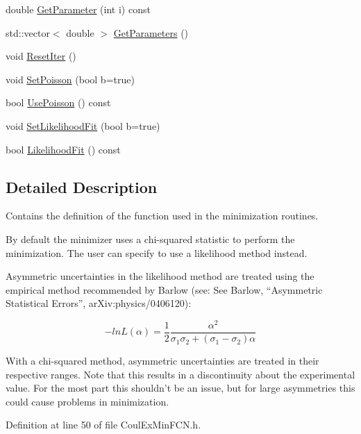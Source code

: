 \begin{DoxyCompactItemize}
double \hyperlink{classCoulExMinFCN_aa588591bbc923ab42070b42b74c1dfc8}{Get\-Parameter} (int i) const 
\item 
std\-::vector$<$ double $>$ \hyperlink{classCoulExMinFCN_ac49f8e36a62aac46b1300eca173f486f}{Get\-Parameters} ()
\item 
void \hyperlink{classCoulExMinFCN_ad15983e7cecf6fb939c55d47b2a9e700}{Reset\-Iter} ()
\item 
void \hyperlink{classCoulExMinFCN_a96c96926312d6e52c797274035410894}{Set\-Poisson} (bool b=true)
\item 
bool \hyperlink{classCoulExMinFCN_a076212903b18324a472ef11310bf8fc3}{Use\-Poisson} () const 
\item 
void \hyperlink{classCoulExMinFCN_a17f18c83c3a60c89e038f91b946c495d}{Set\-Likelihood\-Fit} (bool b=true)
\item 
bool \hyperlink{classCoulExMinFCN_a126ede898be9dd935ea7f65b7120f223}{Likelihood\-Fit} () const 
\end{DoxyCompactItemize}


\subsection{Detailed Description}
Contains the definition of the function used in the minimization routines. 

By default the minimizer uses a chi-\/squared statistic to perform the minimization. The user can specify to use a likelihood method instead.

Asymmetric uncertainties in the likelihood method are treated using the empirical method recommended by Barlow (see\-: See Barlow, “\-Asymmetric Statistical Errors”, ar\-Xiv\-:physics/0406120)\-:

\[ -lnL(\alpha) = \frac{1}{2} \frac{\alpha^2}{\sigma_1\sigma_2 + (\sigma_1 - \sigma_2)\alpha} \]

With a chi-\/squared method, asymmetric uncertainties are treated in their respective ranges. Note that this results in a discontinuity about the experimental value. For the most part this shouldn't be an issue, but for large asymmetries this could cause problems in minimization. 

Definition at line 50 of file Coul\-Ex\-Min\-F\-C\-N.\-h.



